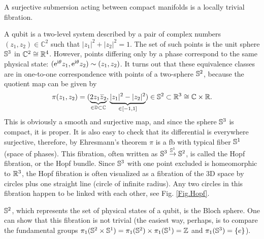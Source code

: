 \begin{cor}
    A surjective submersion acting between compact manifolds is a locally trivial fibration.
\end{cor}


\begin{example}\label{Hopf bundle}
    A qubit is a two-level system described by a pair of complex numbers $(z_1,z_2)\in\mathbb{C}^2$ such that $|z_1|^2+|z_2|^2=1$. The set of such points is the unit sphere $\mathbb{S}^3$ in $\mathbb{C}^2\cong\mathbb{R}^4$. However, points differing only by a phase correspond to the same physical state: $(\mathrm{e}^{\mathrm{i}\theta}z_1,\mathrm{e}^{\mathrm{i}\theta}z_2)\sim(z_1,z_2)$. It turns out that these equivalence classes are in one-to-one correspondence with points of a two-sphere $\mathbb{S}^2$, because the quotient map can be given by
    \[\pi(z_1,z_2)=(\underbrace{2z_1\wb{z}_2}_{\in \mathbb{D}\subset\mathbb{C}},\underbrace{|z_1|^2-|z_2|^2}_{\in [-1,1]})\in \bbS^2\subset\bbR^3\cong \mathbb{C}\times\bbR.\]
    This is obviously a smooth and surjective map, and since the sphere $\mathbb{S}^3$ is compact, it is proper. It is also easy to check that its differential is everywhere surjective, therefore, by Ehresmann's theorem $\pi$ is a \gls{fb} with typical fiber $\mathbb{S}^1$ (space of phases). This fibration, often written as $\mathbb{S}^3\overset{\mathbb{S}^1}{\to}\mathbb{S}^2$, is called the Hopf fibration, or the Hopf bundle. Since $\mathbb{S}^3$ with one point excluded is homeomorphic to $\mathbb{R}^3$, the Hopf fibration is often visualized as a fibration of the 3D space by circles plus one straight line (circle of infinite radius). Any two circles in this fibration happen to be linked with each other, see Fig. \ref{Fig.Hopf}.
    
    $\mathbb{S}^2$, which represents the set of physical states of a qubit, is the Bloch sphere. One can show that this fibration is not trivial (the easiest way, perhaps, is to compare the fundamental groups $\pi_1(\mathbb{S}^2\times \mathbb{S}^1)=\pi_1(\mathbb{S}^2)\times\pi_1(\mathbb{S}^1)=\mathbb{Z}$ and $\pi_1(\mathbb{S}^3)=\{e\}$).
    

\end{example}
